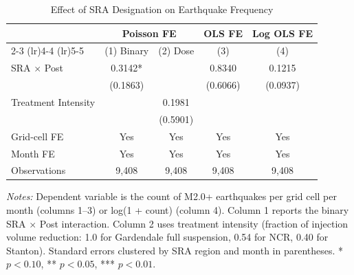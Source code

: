 \begin{table}[htbp]
\centering
\caption{Effect of SRA Designation on Earthquake Frequency}
\label{tab:main}
\begin{threeparttable}
\begin{tabular}{lcccc}
\toprule
 & \multicolumn{2}{c}{Poisson FE} & OLS FE & Log OLS FE \\
\cmidrule(lr){2-3} \cmidrule(lr){4-4} \cmidrule(lr){5-5}
 & (1) Binary & (2) Dose & (3) & (4) \\
\midrule
SRA $\times$ Post & 0.3142* & & 0.8340 & 0.1215 \\
 & (0.1863) & & (0.6066) & (0.0937) \\
Treatment Intensity & & 0.1981 & & \\
 & & (0.5901) & & \\
\midrule
Grid-cell FE & Yes & Yes & Yes & Yes \\
Month FE & Yes & Yes & Yes & Yes \\
Observations & 9,408 & 9,408 & 9,408 & 9,408 \\
\bottomrule
\end{tabular}
\begin{tablenotes}[flushleft]\small
\item \textit{Notes:} Dependent variable is the count of M2.0+ earthquakes per grid cell per month (columns 1--3) or log(1 + count) (column 4). Column 1 reports the binary SRA $\times$ Post interaction. Column 2 uses treatment intensity (fraction of injection volume reduction: 1.0 for Gardendale full suspension, 0.54 for NCR, 0.40 for Stanton). Standard errors clustered by SRA region and month in parentheses. * $p<0.10$, ** $p<0.05$, *** $p<0.01$.
\end{tablenotes}
\end{threeparttable}
\end{table}
